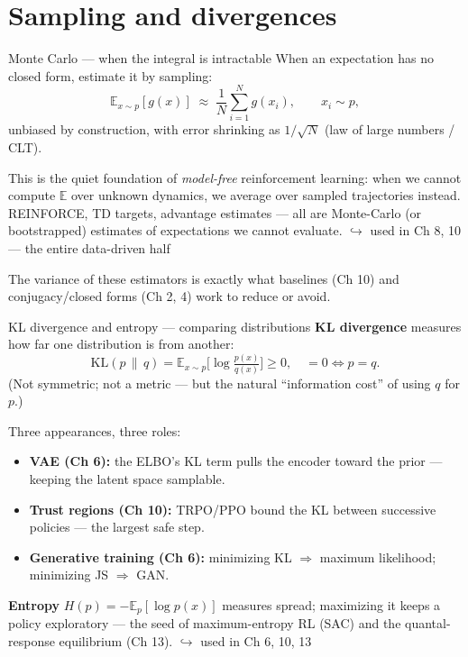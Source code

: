 \documentclass[10pt, aspectratio=169]{beamer}
\newcommand{\usedin}[1]{\hfill{\footnotesize\textcolor{mDarkTeal}{$\hookrightarrow$ used in #1}}}
\begin{document}
\section{Sampling and divergences}

\begin{frame}{Monte Carlo --- when the integral is intractable}
When an expectation has no closed form, \alert{estimate it by sampling}:
\[
\mathbb{E}_{x\sim p}[g(x)] \;\approx\; \frac1N\sum_{i=1}^N g(x_i), \qquad x_i \sim p,
\]
unbiased by construction, with error shrinking as $1/\sqrt{N}$ (law of large numbers / CLT).
\medskip

\pause
This is the quiet foundation of \emph{model-free} reinforcement learning: when we cannot compute $\mathbb{E}$ over unknown dynamics, we average over sampled trajectories instead. REINFORCE, TD targets, advantage estimates --- all are Monte-Carlo (or bootstrapped) estimates of expectations we cannot evaluate. \usedin{Ch 8, 10 --- the entire data-driven half}
\medskip

\pause
{\footnotesize\textcolor{mLightBrown}{The variance of these estimators is exactly what baselines (Ch 10) and conjugacy/closed forms (Ch 2, 4) work to reduce or avoid.}}
\end{frame}

\begin{frame}{KL divergence and entropy --- comparing distributions}
\textbf{KL divergence} measures how far one distribution is from another:
\[
\mathrm{KL}(p\,\|\,q) = \mathbb{E}_{x\sim p}\Big[\log\tfrac{p(x)}{q(x)}\Big] \ge 0, \quad =0 \iff p=q.
\]
(Not symmetric; not a metric --- but the natural ``information cost'' of using $q$ for $p$.)
\medskip

\pause
Three appearances, three roles:
\begin{itemize}\setlength\itemsep{1pt}
\item \textbf{VAE (Ch 6):} the ELBO's KL term pulls the encoder toward the prior --- keeping the latent space samplable.
\item \textbf{Trust regions (Ch 10):} TRPO/PPO bound the KL between successive policies --- the largest safe step.
\item \textbf{Generative training (Ch 6):} minimizing KL $\Rightarrow$ maximum likelihood; minimizing JS $\Rightarrow$ GAN.
\end{itemize}
\medskip

\pause
\textbf{Entropy} $H(p) = -\mathbb{E}_p[\log p(x)]$ measures spread; maximizing it keeps a policy exploratory --- the seed of maximum-entropy RL (SAC) and the quantal-response equilibrium (Ch 13). \usedin{Ch 6, 10, 13}
\end{frame}
\end{document}
